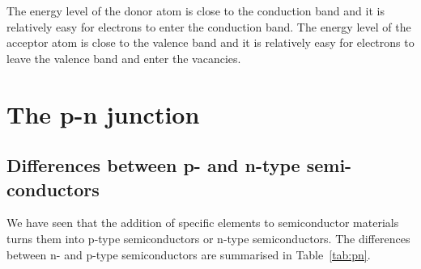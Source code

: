The energy level of the donor atom is close to the conduction band and it is relatively easy for electrons to enter the conduction band. The energy level of the acceptor atom is close to the valence band and it is relatively easy for electrons to leave the valence band and enter the vacancies.


\section{The p-n junction}

\subsection{Differences between p- and n-type semi-conductors}
We have seen that the addition of specific elements to semiconductor materials turns them into p-type semiconductors or n-type semiconductors. The differences between n- and p-type semiconductors are summarised in Table~\ref{tab:pn}.

